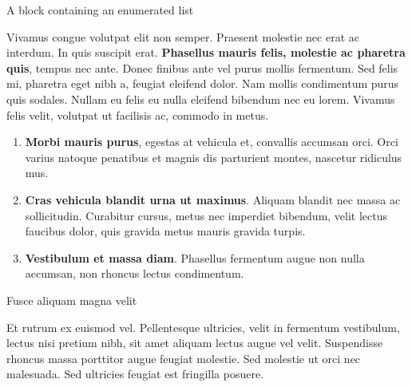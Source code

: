 \documentclass[final]{beamer}
\newlength{\colwidth}
\begin{document}
\begin{frame}[t]
\begin{columns}[t]
\begin{column}{\colwidth}
                \begin{block}{A block containing an enumerated list}

                    Vivamus congue volutpat elit non semper. Praesent molestie nec erat ac
                    interdum. In quis suscipit erat. \textbf{Phasellus mauris felis, molestie
                    ac pharetra quis}, tempus nec ante. Donec finibus ante vel purus mollis
                    fermentum. Sed felis mi, pharetra eget nibh a, feugiat eleifend dolor. Nam
                    mollis condimentum purus quis sodales. Nullam eu felis eu nulla eleifend
                    bibendum nec eu lorem. Vivamus felis velit, volutpat ut facilisis ac,
                    commodo in metus.

                    \begin{enumerate}
                        \item \textbf{Morbi mauris purus}, egestas at vehicula et, convallis
                        accumsan orci. Orci varius natoque penatibus et magnis dis parturient
                        montes, nascetur ridiculus mus.
                        \item \textbf{Cras vehicula blandit urna ut maximus}. Aliquam blandit nec
                        massa ac sollicitudin. Curabitur cursus, metus nec imperdiet bibendum,
                        velit lectus faucibus dolor, quis gravida metus mauris gravida turpis.
                        \item \textbf{Vestibulum et massa diam}. Phasellus fermentum augue non
                        nulla accumsan, non rhoncus lectus condimentum.
                    \end{enumerate}

                \end{block}

                \begin{block}{Fusce aliquam magna velit}

                    Et rutrum ex euismod vel. Pellentesque ultricies, velit in fermentum
                    vestibulum, lectus nisi pretium nibh, sit amet aliquam lectus augue vel
                    velit. Suspendisse rhoncus massa porttitor augue feugiat molestie. Sed
                    molestie ut orci nec malesuada. Sed ultricies feugiat est fringilla
                    posuere.


\end{block}
\end{column}
\end{columns}
\end{frame}
\end{document}
